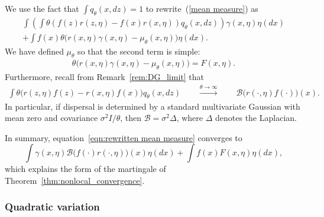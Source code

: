 \documentclass[EJP]{ejpecp} %
\newcommand{\DG}{\mathcal{B}}  %
\begin{document}
We use the fact that $\int q_\theta(x,dz)=1$ to rewrite~(\ref{mean measure})
as 
\begin{equation}
\label{eqn:rewritten mean measure}
\begin{split}
    \int\left(
        \int \theta \left( f(z) r(z,\eta)- f(x) r(x,\eta) \right) q_\theta(x,dz)
    \right)
    \gamma(x,\eta)
    \eta(dx)
    \\
    + \int f(x) \theta \Big(
        r(x,\eta) \gamma(x,\eta)
        - \mu_\theta(x,\eta)
    \Big) \eta(dx).
\end{split}
\end{equation}
We have defined $\mu_\theta$ so that the second term is simple:
\begin{align*}
    \theta \Big( r(x,\eta) \gamma(x,\eta) - \mu_\theta(x,\eta) \Big)
    = F(x, \eta) .
\end{align*}
Furthermore, recall from Remark~\ref{rem:DG_limit} that
\begin{align} \label{eqn:near_critical}
    \int \theta \Big(
        r(z,\eta) f(z)
        -
        r(x,\eta) f(x)
    \Big) q_\theta(x,dz) 
    \qquad \stackrel{\theta\to\infty}{\longrightarrow} \qquad  
    \DG \big(r(\cdot,\eta)f(\cdot)\big)(x) .
\end{align}
In particular,
if dispersal is determined by a standard multivariate Gaussian
with mean zero and covariance $\sigma^2 I / \theta$,
then $\DG = \sigma^2 \Delta$, where $\Delta$ denotes the Laplacian.

In summary, equation~\eqref{eqn:rewritten mean measure} converges to
\begin{equation} \label{limit of mean measure equation}
\int \gamma(x,\eta)
\DG \big(f(\cdot)r(\cdot,\eta)\big)(x)
\eta(dx)
+
\int f(x)
F(x,\eta)
\eta(dx) ,
\end{equation}
which explains the form of the martingale of Theorem~\ref{thm:nonlocal_convergence}.


\subsubsection*{Quadratic variation}

\end{document}
